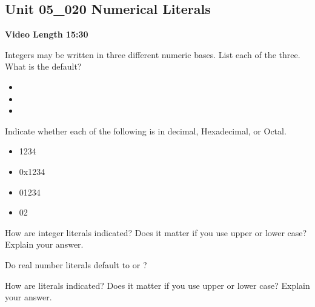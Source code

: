 \documentclass[letterpaper,12pt]{exam}
\newcommand{\unit}{Unit 05}
\begin{document}
\begin{questions}
\section*{\unit\_020 Numerical Literals} %
\noindent \textbf{Video Length 15:30}

\begin{samepage}
    \question Integers may be written in three different numeric bases.  List each of the three.  What is the default?
      \begin{itemize}
        \item 
        \vspace{5mm}
        \item 
        \vspace{5mm}
        \item 
        \vspace{5mm}
       \end{itemize}
\end{samepage}

\begin{samepage}
    \question Indicate whether each of the following is in decimal, Hexadecimal, or Octal.
      \begin{itemize}
        \item 1234
        \vspace{5mm}
        \item 0x1234
        \vspace{5mm}
        \item 01234
        \vspace{5mm}
        \item 02
        \vspace{5mm}
       \end{itemize}
\end{samepage}

\begin{samepage}
    \question How are  integer literals indicated?  Does it matter if you use upper or lower case?  Explain your answer.
    \vspace{5mm}
\end{samepage}

\begin{samepage}
    \question Do real number literals default to  or ?
    \vspace{5mm}
\end{samepage}

\begin{samepage}
    \question How are  literals indicated?  Does it matter if you use upper or lower case?  Explain your answer.
    \vspace{5mm}
\end{samepage}


\end{questions}
\end{document}
